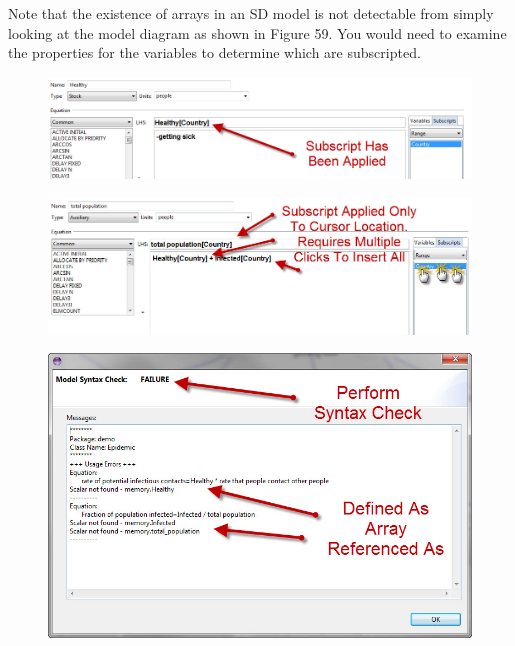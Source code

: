 \documentclass[11pt]{amsart}
\begin{document}
Note that the existence of arrays in an SD model is not detectable from simply looking at the model diagram as shown in Figure 59. You would need to examine the properties for the variables to determine which are subscripted.

\begin{figure}[ht]
\begin{center}
\vspace{.2in}
\centerline {
\includegraphics[totalheight=0.15\textheight]{images/057.jpg}
}
\caption{}
\label{fig:057}
\end{center}
\end{figure}




\begin{figure}[ht]
\begin{center}
\vspace{.2in}
\centerline {
\includegraphics[totalheight=0.15\textheight]{images/058.jpg}
}
\caption{}
\label{fig:058}
\end{center}
\end{figure}




\begin{figure}[ht]
\begin{center}
\vspace{.2in}
\centerline {
\includegraphics[totalheight=0.35\textheight]{images/059.jpg}
}
\caption{}
\label{fig:059}
\end{center}
\end{figure}
\end{document}
